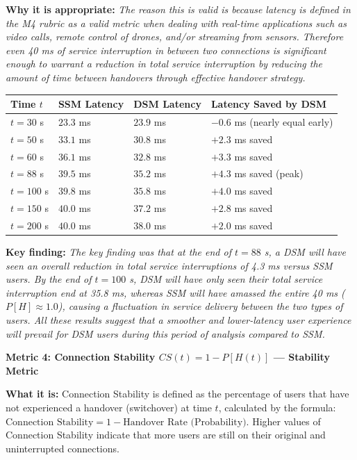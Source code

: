 \documentclass[11pt]{article}
\newcommand{\subquestion}[1]{
    \vspace{0.3cm}
    \noindent\textbf{#1}
    \vspace{0.1cm}
}
\newcommand{\highlight}[1]{\textit{#1}}
\begin{document}
\begin{enumerate}[label=\textbf{Scribe Question \arabic*:}, leftmargin=*, itemsep=1.5em]
\textbf{Why it is appropriate:} \highlight{The reason this is valid is because latency is defined in
the M4 rubric as a valid metric when dealing with real-time applications such as video calls, remote
control of drones, and/or streaming from sensors. Therefore even 40 ms of service interruption in
between two connections is significant enough to warrant a reduction in total service interruption by
reducing the amount of time between handovers through effective handover strategy.}

\vspace{0.3cm}
\begin{center}
\begin{tabular}{llll}
    \toprule
    \textbf{Time $t$} & \textbf{SSM Latency} & \textbf{DSM Latency} & \textbf{Latency Saved by DSM} \\
    \midrule
    $t = 30$ s  & $23.3$ ms & $23.9$ ms & $-0.6$ ms (nearly equal early) \\
    $t = 50$ s  & $33.1$ ms & $30.8$ ms & $+2.3$ ms saved \\
    $t = 60$ s  & $36.1$ ms & $32.8$ ms & $+3.3$ ms saved \\
    $t = 88$ s  & $39.5$ ms & $35.2$ ms & $+4.3$ ms saved (peak) \\
    $t = 100$ s & $39.8$ ms & $35.8$ ms & $+4.0$ ms saved \\
    $t = 150$ s & $40.0$ ms & $37.2$ ms & $+2.8$ ms saved \\
    $t = 200$ s & $40.0$ ms & $38.0$ ms & $+2.0$ ms saved \\
    \bottomrule
\end{tabular}
\end{center}
\vspace{0.3cm}

\textbf{Key finding:} \highlight{The key finding was that at the end of $t = 88$ s, a DSM will have
seen an overall reduction in total service interruptions of 4.3 ms versus SSM users. By the end of
$t = 100$ s, DSM will have only seen their total service interruption end at 35.8 ms, whereas SSM
will have amassed the entire 40 ms ($P[H] \approx 1.0$), causing a fluctuation in service delivery
between the two types of users. All these results suggest that a smoother and lower-latency user
experience will prevail for DSM users during this period of analysis compared to SSM.}

\subquestion{Metric 4: Connection Stability $CS(t) = 1 - P[H(t)]$ --- Stability Metric}

\textbf{What it is:} Connection Stability is defined as the percentage of users that have not
experienced a handover (switchover) at time $t$, calculated by the formula:
$\text{Connection Stability} = 1 - \text{Handover Rate (Probability)}$.
Higher values of Connection Stability indicate that more users are still on their original and
uninterrupted connections.


\end{enumerate}
\end{document}
